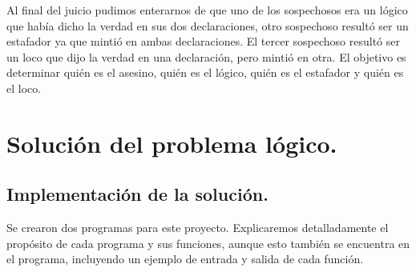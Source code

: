 \documentclass[letterpaper,11pt]{article}
\begin{document}
    Al final del juicio pudimos enterarnos de que uno de los sospechosos era un
    lógico que había dicho la verdad en sus dos declaraciones, otro sospechoso
    resultó ser un estafador ya que mintió en ambas declaraciones. El tercer 
    sospechoso resultó ser un loco que dijo la verdad en una declaración, pero 
    mintió en otra.
    El objetivo es determinar quién es el asesino, quién es el lógico, quién es
    el estafador y quién es el loco.

    \section{Solución del problema lógico.}
    \subsection{Implementación de la solución.}
    Se crearon dos programas para este proyecto. Explicaremos detalladamente el 
    propósito de cada programa y sus funciones, aunque esto también se 
    encuentra en el programa, incluyendo un ejemplo de entrada y salida de 
    cada función.
\end{document}

